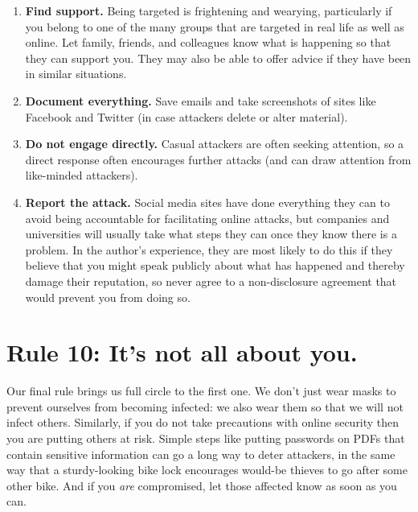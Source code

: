 \documentclass[10pt,letterpaper]{article}
\begin{document}
\begin{enumerate}

\item
  \textbf{Find support.}
  Being targeted is frightening and wearying,
  particularly if you belong to one of the many groups that are targeted in real life
  as well as online.
  Let family, friends, and colleagues know what is happening so that they can support you.
  They may also be able to offer advice if they have been in similar situations.
  
\item
  \textbf{Document everything.}
  Save emails
  and take screenshots of sites like Facebook and Twitter
  (in case attackers delete or alter material).

\item
  \textbf{Do not engage directly.}
  Casual attackers are often seeking attention,
  so a direct response often encourages further attacks
  (and can draw attention from like-minded attackers).
  
\item
  \textbf{Report the attack.}
  Social media sites have done everything they can
  to avoid being accountable for facilitating online attacks,
  but companies and universities will usually take what steps they can
  once they know there is a problem.
  In the author's experience,
  they are most likely to do this if they believe that
  you might speak publicly about what has happened
  and thereby damage their reputation,
  so never agree to a non-disclosure agreement that would prevent you from doing so.
  
\end{enumerate}

\section*{Rule 10: It's not all about you.}

Our final rule brings us full circle to the first one.
We don't just wear masks to prevent ourselves from becoming infected:
we also wear them so that we will not infect others.
Similarly,
if you do not take precautions with online security then you are putting others at risk.
Simple steps like putting passwords on PDFs that contain sensitive information
can go a long way to deter attackers,
in the same way that a sturdy-looking bike lock encourages would-be thieves to go after some other bike.
And if you \emph{are} compromised,
let those affected know as soon as you can.
\end{document}
